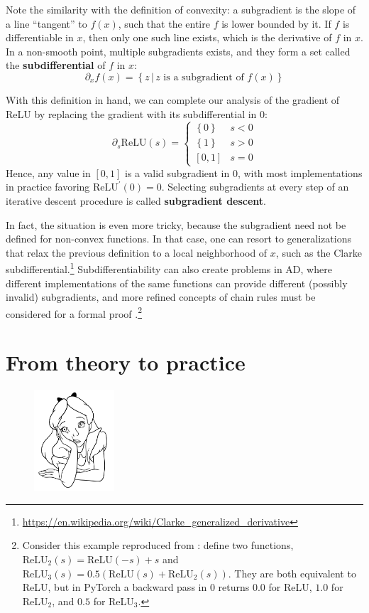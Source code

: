 Note the similarity with the definition of convexity: a subgradient is the slope of a line “tangent” to $f(x)$, such that the entire $f$ is lower bounded by it. If $f$ is differentiable in $x$, then only one such line exists, which is the derivative of $f$ in $x$. In a non-smooth point, multiple subgradients exists, and they form a set called the \textbf{subdifferential} of $f$ in $x$:
%
$$
\partial_x f(x)=\left\{z \,\vert\, z \text{ is a subgradient of } f(x)\right\}
$$

With this definition in hand, we can complete our analysis of the gradient of ReLU by replacing the gradient with its subdifferential in $0$:
%
$$
\partial_s \text{ReLU}(s)=\begin{cases} \left\{0\right\} & s < 0 \\ \left\{1\right\} & s >0 \\ \left[0,1\right] & s=0 \end{cases}
$$
%
Hence, any value in $[0,1]$ is a valid subgradient in $0$, with most implementations in practice favoring $\text{ReLU}^\prime(0)=0$. Selecting subgradients at every step of an iterative descent procedure is called \textbf{subgradient descent}. 

In fact, the situation is even more tricky, because the subgradient need not be defined for non-convex functions. In that case, one can resort to generalizations that relax the previous definition to a local neighborhood of $x$, such as the Clarke subdifferential.\footnote{\url{https://en.wikipedia.org/wiki/Clarke_generalized_derivative}} Subdifferentiability can also create problems in AD, where different implementations of the same functions can provide different (possibly invalid) subgradients, and more refined concepts of chain rules must be considered for a formal proof \cite{kakade2018provably,bolte2020mathematical}.\footnote{Consider this example reproduced from \cite{bolte2020mathematical}: define two functions, $\text{ReLU}_2(s) = \text{ReLU}(-s)+s$ and $\text{ReLU}_3(s) = 0.5(\text{ReLU}(s)+\text{ReLU}_2(s))$. They are both equivalent to ReLU, but in PyTorch a backward pass in $0$ returns $0.0$ for ReLU, $1.0$ for ReLU$_2$, and $0.5$ for ReLU$_3$.}

\section*{From theory to practice}

\begin{figure}
\vspace{-3em}\includegraphics[width=3.0cm]{images/shutterstock_2075221579.jpg}
\vspace{-3em}
\end{figure}

